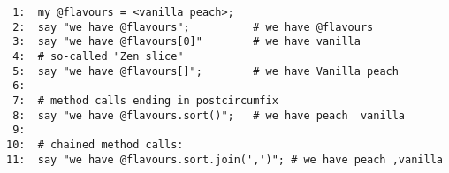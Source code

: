 \documentclass[11pt]{ctexart}
\begin{document}
\begin{verbatim}
 1:  my @flavours = <vanilla peach>;
 2:  say "we have @flavours";          # we have @flavours
 3:  say "we have @flavours[0]"        # we have vanilla
 4:  # so-called "Zen slice"
 5:  say "we have @flavours[]";        # we have Vanilla peach 
 6:  
 7:  # method calls ending in postcircumfix
 8:  say "we have @flavours.sort()";   # we have peach  vanilla
 9:  
10:  # chained method calls:
11:  say "we have @flavours.sort.join(',')"; # we have peach ,vanilla
\end{verbatim}
\end{document}
